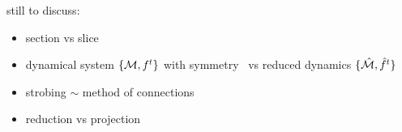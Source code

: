     \ifdraft\color{blue}
still to discuss:
\begin{itemize}

  \item section {\PoincS} vs slice \pSRed

  \item
dynamical system $\{{\cal M},f^t\}$ with symmetry \Group\ vs reduced dynamics
$\{\hat{\cal M},\hat{f}^t\}$
  \item strobing $\sim$ method of connections
  \item reduction vs projection
\end{itemize}
    \color{black}\fi

